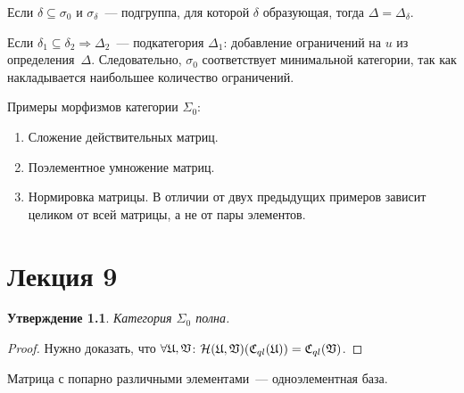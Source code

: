 \documentclass[a4paper, 12pt]{report}
\newtheorem{St}{Утверждение}[chapter]
\begin{document}
Если $\delta \subseteq \sigma_0$ и $\sigma_{\delta}$~--- подгруппа, для которой $\delta$ образующая, тогда $\Delta = \Delta_{\delta}$.

Если $\delta_1 \subseteq \delta_2 \Rightarrow \Delta_2$~--- подкатегория $\Delta_1$: добавление ограничений на $u$ из определения~$\Delta$. Следовательно, $\sigma_0$ соответствует минимальной категории, так как накладывается наибольшее количество ограничений.

Примеры морфизмов категории $\Sigma_0$:
\begin{enumerate}
\item Сложение действительных матриц.
\item Поэлементное умножение матриц.
\item Нормировка матрицы. В отличии от двух предыдущих примеров зависит целиком от всей матрицы, а не от пары элементов.
\end{enumerate}
\chapter{Лекция 9}
\begin{St}
Категория $\Sigma_0$ полна.
\end{St}
\begin{proof}
Нужно доказать, что $\forall \mathfrak{U}, \mathfrak{V}$: $\mathcal{H}(\mathfrak{U}, \mathfrak{V})(\mathfrak{C}_{ql}(\mathfrak{U})) = \mathfrak{C}_{ql}(\mathfrak{V})$.
\end{proof}

Матрица с попарно различными элементами~--- одноэлементная база.
\end{document}

